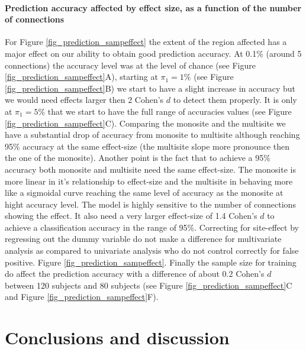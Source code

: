 \documentclass[authoryear]{elsarticle}
\begin{document}
\paragraph{Prediction accuracy affected by effect size, as a function of the number of connections}
For Figure \ref{fig_prediction_sampeffect} the extent of the region affected has a major effect on our ability to obtain good prediction accuracy. At 0.1\% (around 5 connections) the accuracy level was at the level of chance (see Figure \ref{fig_prediction_sampeffect}A), starting at $\pi_1=1\%$ (see Figure \ref{fig_prediction_sampeffect}B) we start to have a slight increase in accuracy but we would need effects larger then 2 Cohen's $d$ to detect them properly. It is only at $\pi_1=5\%$ that we start to have the full range of accuracies values (see Figure \ref{fig_prediction_sampeffect}C). Comparing the monosite and the multisite we have a substantial drop of accuracy from monosite to multisite although reaching 95\% accuracy at the same effect-size (the multisite slope more pronounce then the one of the monosite). Another point is the fact that to achieve a 95\% accuracy both monosite and multisite need the same effect-size. The monosite is more linear in it's relationship to effect-size and the multisite in behaving more like a sigmoidal curve reaching the same level of accuracy as the monosite at hight accuracy level. The model is highly sensitive to the number of connections showing the effect. It also need a very larger effect-size of 1.4 Cohen's $d$ to achieve a classification accuracy in the range of 95\%. Correcting for site-effect by regressing out the dummy variable do not make a difference for multivariate analysis as compared to univariate analysis who do not control correctly for false positive.
Figure \ref{fig_prediction_sampeffect}. Finally the sample size for training do affect the prediction accuracy with a difference of about 0.2 Cohen's $d$ between 120 subjects and 80 subjects (see Figure \ref{fig_prediction_sampeffect}C and Figure \ref{fig_prediction_sampeffect}F).


\section{Conclusions and discussion}
\end{document}
